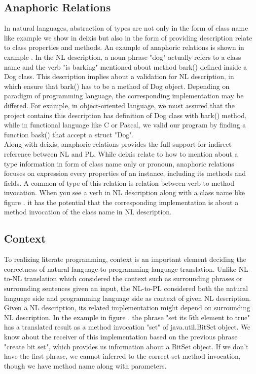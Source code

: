 \subsection{Anaphoric Relations}
In natural languages, abstraction of types are not only in the form of class name like example we show in deixis but also in the form of providing description relate to class properties and methods. An example of anaphoric relations is  shown in example \cite{}. In the NL description, a noun phrase "dog" actually refers to a class name and the verb "is barking" mentioned about method bark() defined inside a Dog class. This description implies about a validation for NL description, in which ensure that bark() has to be a method of Dog object. Depending on paradigm of programming language, the corresponding implementation may be differed. For example, in object-oriented language, we must assured that the project contains this description has definition of Dog class with bark() method, while in functional language like C or Pascal, we valid our program by finding a function bask() that accept a struct "Dog". \\

Along with deixis, anaphoric relations provides the full support for indirect reference between NL and PL. While deixis relate to how to mention about a type information in form of class name only or pronoun, anaphoric relations focuses on expression every properties of an instance, including its methods and fields. A common of type of this relation is relation between verb to method invocation. When you see a verb in NL description along with a class name like figure \cite{}. it has the potential that the corresponding implementation is about a method invocation of the class name in NL description. 
\subsection{Context}
To realizing literate programming, context is an important element deciding the correctness of natural language to programming language translation. Unlike NL-to-NL translation which considered the context such as surrounding phrases or surrounding sentences given an input, the NL-to-PL considered both the natural language side and programming language side as context of given NL description. \\

Given a NL description, its related implementation might depend on surrounding NL description. In the example in figure \cite{}. the phrase "set its 5th element to true" has a translated result as a method invocation "set" of java.util.BitSet object. We know about the receiver of this implementation based on the previous phrase "create bit set", which provides us information about a BitSet object. If we don't have the first phrase, we cannot inferred to the correct set method invocation, though we have method name along with parameters. \\

